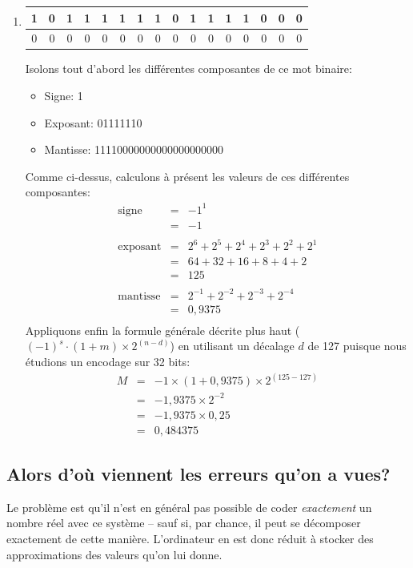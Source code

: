 \documentclass[12pt]{article}
\newenvironment{MaReponse}
		{\begin{greyedtextbox}\itshape} %
		{\end{greyedtextbox}}            %
\newenvironment{alphenum}
{\begin{enumerate}[label=\alph*.]}
	{\end{enumerate}}
\begin{document}
\begin{MaReponse}
\begin{alphenum}
			\item
			\begin{tabular}{|c|c|c|c|c|c|c|c|c|c|c|c|c|c|c|c|} %
				\hline
				1&0&1&1&1&1&1&1&0&1&1&1&1&0&0&0 \\
				\hline
				0&0&0&0&0&0&0&0&0&0&0&0&0&0&0&0 \\
				\hline
			\end{tabular}
			\par
			Isolons tout d'abord les différentes composantes de ce mot binaire:
			\begin{itemize}
				\item Signe: 1
				\item Exposant: 01111110
				\item Mantisse: 11110000000000000000000
			\end{itemize}
			Comme ci-dessus, calculons à présent les valeurs de ces différentes composantes:
			\[
			\begin{array}{lll}
				\text{signe} & \text{=} & -1^1\\
				& \text{=} & -1\\
				\\
				\text{exposant} & \text{=} & 2^6 + 2^5 + 2^4 + 2^3 + 2^2 + 2^1 \\
				& \text{=} & 64 + 32 + 16 + 8 + 4 + 2\\
				& \text{=} & 125\\
				\\
				\text{mantisse} & \text{=} & 2^{-1} + 2^{-2} + 2^{-3} + 2^{-4}\\
				& \text{=} & 0,9375\\
			\end{array}
			\]
			Appliquons enfin la formule générale décrite plus haut ($(-1)^s\cdot (1+m) \times 2^{(n-d)}$) en utilisant un décalage $d$ de 127 puisque nous étudions un encodage sur 32 bits:
			\[
			\begin{array}{lll}
				M& \text{=} & -1 \times (1+0,9375) \times 2^{(125 - 127)}\\
				& \text{=} & -1,9375 \times 2^{-2}\\
				& \text{=} & -1,9375 \times 0,25\\
				& \text{=} & 0,484375\
			\end{array}
			\]
		\end{alphenum}
	\end{MaReponse}
	
	\subsection{Alors d'où viennent les erreurs qu'on a vues?}
	Le problème est qu'il n'est en général pas possible de coder \textit{exactement} un nombre réel avec ce système -- sauf si, par chance, il peut se décomposer exactement de cette manière. L'ordinateur en est donc réduit à stocker des approximations des valeurs qu'on lui donne.
	
\end{document}
